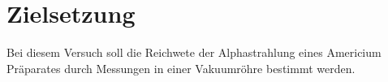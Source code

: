 \section{Zielsetzung}
\label{sec:Zielsetzung}
Bei diesem Versuch soll die Reichwete der Alphastrahlung eines Americium Präparates durch Messungen in einer Vakuumröhre bestimmt werden. 
